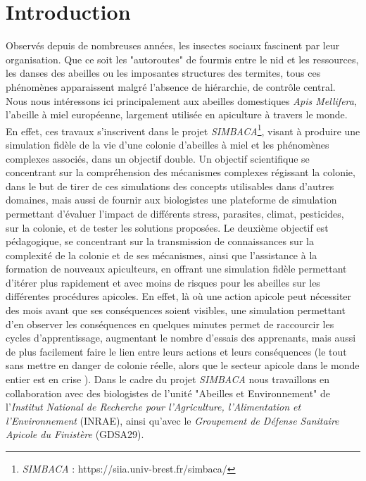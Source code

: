 \chapter*{Introduction}


	Observés depuis de nombreuses années, les insectes sociaux fascinent par leur organisation. Que ce soit les "autoroutes" de fourmis entre le nid et les ressources, les danses des abeilles ou les imposantes structures des termites, tous ces phénomènes apparaissent malgré l'absence de hiérarchie, de contrôle central. Nous nous intéressons ici principalement aux abeilles domestiques \textit{Apis Mellifera}, l'abeille à miel européenne, largement utilisée en apiculture à travers le monde. 
	En effet, ces travaux s'inscrivent dans le projet \textit{SIMBACA}\footnote{\textit{SIMBACA} : https://siia.univ-brest.fr/simbaca/}, visant à produire une simulation fidèle de la vie d'une colonie d'abeilles à miel et les phénomènes complexes associés, dans un objectif double. Un objectif scientifique se concentrant sur la compréhension des mécanismes complexes régissant la colonie, dans le but de tirer de ces simulations des concepts utilisables dans d'autres domaines, mais aussi de fournir aux biologistes une plateforme de simulation permettant d'évaluer l'impact de différents stress, parasites, climat, pesticides, sur la colonie, et de tester les solutions proposées. 
	Le deuxième objectif est pédagogique, se concentrant sur la transmission de connaissances sur la complexité de la colonie et de ses mécanismes, ainsi que l'assistance à la formation de nouveaux apiculteurs, en offrant une simulation fidèle permettant d'itérer plus rapidement et avec moins de risques pour les abeilles sur les différentes procédures apicoles. En effet, là où une action apicole peut nécessiter des mois avant que ses conséquences soient visibles, une simulation permettant d'en observer les conséquences en quelques minutes permet de raccourcir les cycles d'apprentissage, augmentant le nombre d'essais des apprenants, mais aussi de plus facilement faire le lien entre leurs actions et leurs conséquences (le tout sans mettre en danger de colonie réelle, alors que le secteur apicole dans le monde entier est en crise \cite{johnson_honey_2010}). Dans le cadre du projet \textit{SIMBACA} nous travaillons en collaboration avec des biologistes de l'unité "Abeilles et Environnement" de l'\textit{Institut National de Recherche pour l'Agriculture, l'Alimentation et l'Environnement} (INRAE), ainsi qu'avec le \textit{Groupement de Défense Sanitaire Apicole du Finistère} (GDSA29).

